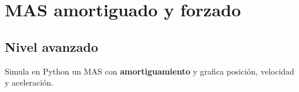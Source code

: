 \documentclass[12pt, a4paper, oneside]{book}
\begin{document}
\chapter{MAS amortiguado y forzado}

\section{Nivel avanzado}

\begin{problema}[title={Problema~18 --- Nivel avanzado}]
Simula en Python un MAS con \textbf{amortiguamiento} y grafica posici\'on, velocidad
y aceleraci\'on.
\end{problema}
\end{document}
